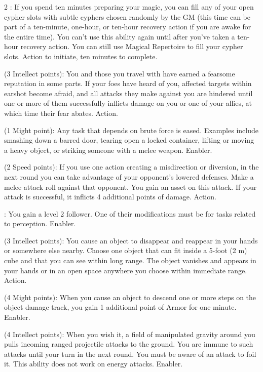 \begin{multicols}{2}
: If you spend ten minutes preparing your magic, you can fill any of your open cypher slots with subtle cyphers chosen randomly by the GM (this time can be part of a ten-minute, one-hour, or ten-hour recovery action if you are awake for the entire time). You can’t use this ability again until after you’ve taken a ten-hour recovery action. You can still use Magical Repertoire to fill your cypher slots. Action to initiate, ten minutes to complete.

 (3 Intellect points): You and those you travel with have earned a fearsome reputation in some parts. If your foes have heard of you, affected targets within earshot become afraid, and all attacks they make against you are hindered until one or more of them successfully inflicts damage on you or one of your allies, at which time their fear abates. Action. 
 
 (1 Might point): Any task that depends on brute force is eased. Examples include smashing down a barred door, tearing open a locked container, lifting or moving a heavy object, or striking someone with a melee weapon. Enabler. 
 
 (2 Speed points): If you use one action creating a misdirection or diversion, in the next round you can take advantage of your opponent’s lowered defenses. Make a melee attack roll against that opponent. You gain an asset on this attack. If your attack is successful, it inflicts 4 additional points of damage. Action. 
 
: You gain a level 2 follower. One of their modifications must be for tasks related to perception. Enabler. 
 
 (3 Intellect points): You cause an object to disappear and reappear in your hands or somewhere else nearby. Choose one object that can fit inside a 5-foot (2 m) cube and that you can see within long range. The object vanishes and appears in your hands or in an open space anywhere you choose within immediate range. Action. 
 
 (4 Might points): When you cause an object to descend one or more steps on the object damage track, you gain 1 additional point of Armor for one minute. Enabler.
 
 (4 Intellect points): When you wish it, a field of manipulated gravity around you pulls incoming ranged projectile attacks to the ground. You are immune to such attacks until your turn in the next round. You must be aware of an attack to foil it. This ability does not work on energy attacks. Enabler. 
 

\end{multicols}
